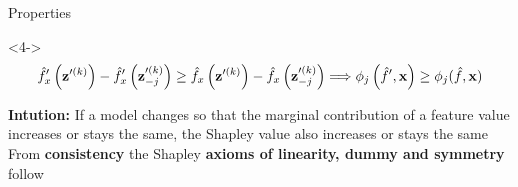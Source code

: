\documentclass[11pt,compress,t,notes=noshow, aspectratio=169, xcolor=table]{beamer}
\begin{document}
\begin{frame}{Properties}
\begin{onlyenv}<4->
$$
\fh_{x}^{\prime}\left(\mathbf{z}^{\prime (k)}\right)-\fh_{x}^{\prime}\left(\mathbf{z}^{\prime (k)}_{-j}\right) \geq \fh_{x}\left(\mathbf{z}^{\prime (k)}\right)-\fh_{x}\left(\mathbf{z}^{\prime (k)} _{-j}\right) \Longrightarrow \phi_{j}\left(\fh^{\prime}, \xv\right) \geq \phi_{j}(\fh, \xv)
$$

\textbf{Intution:} If a model changes so that the marginal contribution of a feature value increases or stays the same, the Shapley value also increases or stays the same\\\medskip 
From \textbf{consistency} the Shapley \textbf{axioms of linearity, dummy and symmetry} follow
\end{onlyenv}


\end{frame}





     
\end{document}
